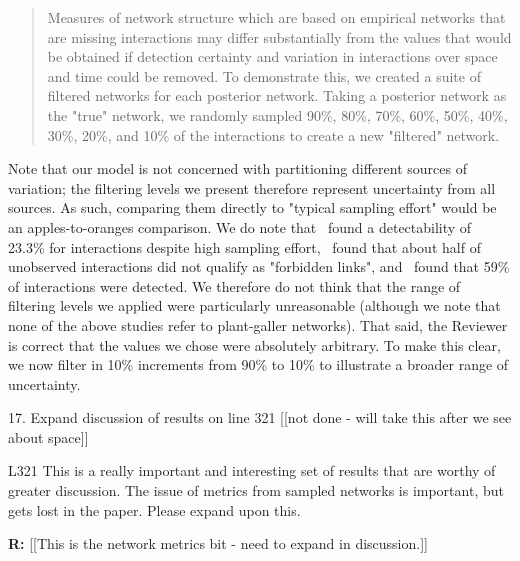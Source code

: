 \documentclass[12pt]{letter}
\newenvironment{refquote}{\bigskip \begin{it}}{\end{it}\smallskip}
\begin{document}
			\begin{quotation}
				Measures of network structure which are based on empirical networks that are missing interactions may differ substantially from the values that would be obtained if detection certainty and variation in interactions over space and time could be removed. To demonstrate this, we created a suite of filtered networks for each posterior network. Taking a posterior network as the "true" network, we randomly sampled 90\%, 80\%, 70\%, 60\%, 50\%, 40\%, 30\%, 20\%, and 10\% of the interactions to create a new "filtered" network.
			\end{quotation}


		Note that our model is not concerned with partitioning different sources of variation; the filtering levels we present therefore represent uncertainty from all sources. As such, comparing them directly to "typical sampling effort" would be an apples-to-oranges comparison. We do note that~\citet{Weinstein2017a} found a detectability of 23.3\% for interactions despite high sampling effort,~\citet{Jordano2016} found that about half of unobserved interactions did not qualify as "forbidden links", and~\citet{Bartomeus2013} found that 59\% of interactions were detected. We therefore do not think that the range of filtering levels we applied were particularly unreasonable (although we note that none of the above studies refer to plant-galler networks). That said, the Reviewer is correct that the values we chose were absolutely arbitrary. To make this clear, we now filter in 10\% increments from 90\% to 10\% to illustrate a broader range of uncertainty.


	17. Expand discussion of results on line 321 [[not done - will take this after we see about space]]

		\begin{refquote}
		L321 This is a really important and interesting set of results that are worthy of greater discussion. The issue of metrics from sampled networks is important, but gets lost in the paper. Please expand upon this.
		\end{refquote}

		\textbf{R:} [[This is the network metrics bit - need to expand in discussion.]]


\clearpage

     
\end{document}
